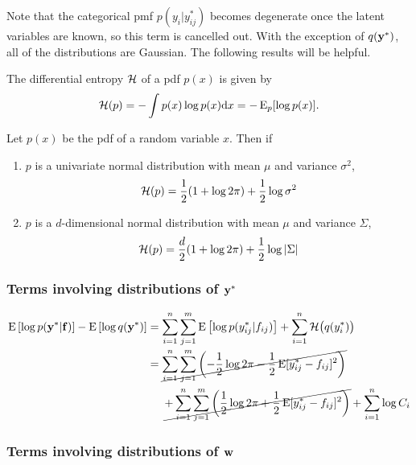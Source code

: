 Note that the categorical pmf $p(y_i|y_{ij}^*)$ becomes degenerate once the latent variables are known, so this term is cancelled out. With the exception of $q(\by^*)$, all of the distributions are Gaussian. The following results will be helpful. 

\begin{definition}
  The differential entropy $\cH$ of a pdf $p(x)$ is given by
  \[
    \cH(p) = -\int p(x) \log p(x) \d x = -\E_p[\log p(x)].
  \]
\end{definition}

\begin{lemma}\label{thm:normentropy}
  Let $p(x)$ be the pdf of a random variable $x$. Then if
  \begin{enumerate}[label=(\roman*)]
    \item $p$ is a univariate normal distribution with mean $\mu$ and variance $\sigma^2$,
    \[
      \cH(p) = \half (1 + \log 2\pi) + \half \log \sigma^2
    \]
    \item $p$ is a $d$-dimensional normal distribution with mean $\mu$ and variance $\Sigma$,
    \[
      \cH(p) = \half[d] (1 + \log 2\pi) + \half \log \vert \Sigma \vert 
    \]
  \end{enumerate}
\end{lemma}

\subsubsection{Terms involving distributions of $\by^*$}

\begin{align*}
  \E\left[ \log p(\by^* | \bff) \right] - \E\left[ \log q(\by^*) \right]
  &= \sum_{i=1}^n \sum_{j=1}^m \E \left[ \log p(y_{ij}^* | f_{ij}) \right] + \sum_{i=1}^n \cH\big(q(y_i^*)\big) \\
  &= \cancel{\sum_{i=1}^n \sum_{j=1}^m \left( -\half\log 2\pi -\half \E[y_{ij}^* - f_{ij}]^2 \right)} \\
  &\phantom{==} \cancel{+ \sum_{i=1}^n \sum_{j=1}^m \left( \half\log 2\pi + \half \E[y_{ij}^* - f_{ij}]^2 \right)} + \sum_{i=1}^n \log C_i \\
\end{align*}

\subsubsection{Terms involving distributions of $\bw$}

